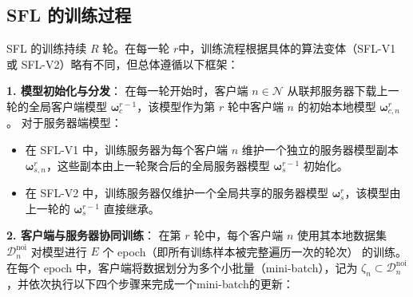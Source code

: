 
\subsection{SFL 的训练过程}\label{subsec:training}
SFL 的训练持续 $R$ 轮。在每一轮 $r$中，训练流程根据具体的算法变体（SFL-V1 或 SFL-V2）略有不同，但总体遵循以下框架：

\textbf{1. 模型初始化与分发}：
在每一轮开始时，客户端 $n \in \mathcal{N}$ 从联邦服务器下载上一轮的全局客户端模型 $\boldsymbol{\omega}_c^{r-1}$，该模型作为第 $r$ 轮中客户端 $n$ 的初始本地模型 $\boldsymbol{\omega}_{c,n}^{r}$。
对于服务器端模型：
\begin{itemize}
    \item 在 SFL-V1 中，训练服务器为每个客户端 $n$ 维护一个独立的服务器模型副本 $\boldsymbol{\omega}_{s,n}^{r}$，这些副本由上一轮聚合后的全局服务器模型 $\boldsymbol{\omega}_s^{r-1}$ 初始化。
    \item 在 SFL-V2 中，训练服务器仅维护一个全局共享的服务器模型 $\boldsymbol{\omega}_s^{r}$，该模型由上一轮的 $\boldsymbol{\omega}_s^{r-1}$ 直接继承。
\end{itemize}

\textbf{2. 客户端与服务器协同训练}：
在第 $r$ 轮中，每个客户端 $n$ 使用其本地数据集 $\mathcal{D}_{n}^{\text{noi}}$ 对模型进行 $E$ 个 epoch（即所有训练样本被完整遍历一次的轮次） 的训练。在每个 epoch 中，客户端将数据划分为多个小批量（mini-batch），记为 $\zeta_n \subset \mathcal{D}_{n}^{\text{noi}}$，并依次执行以下四个步骤来完成一个mini-batch的更新：


